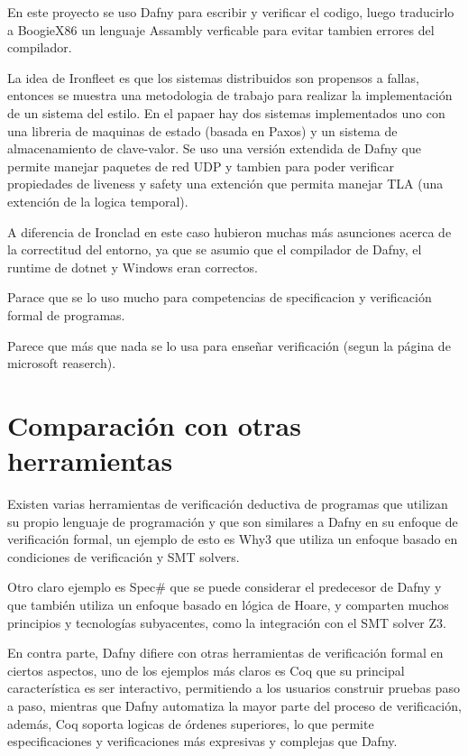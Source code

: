 \documentclass[runningheads]{llncs}
\begin{document}
En este proyecto se uso Dafny para escribir y verificar el codigo, luego traducirlo a BoogieX86 un lenguaje Assambly verficable para evitar tambien errores del compilador.

La idea de Ironfleet\cite{hawblitzel2015ironfleet} es que los sistemas distribuidos son propensos a fallas, entonces se muestra una metodologia de trabajo para realizar la implementación de un sistema del estilo. En el papaer hay dos sistemas implementados uno con una libreria de maquinas de estado (basada en Paxos) y un sistema de almacenamiento de clave-valor.
Se uso una versión extendida de Dafny que permite manejar paquetes de red UDP y tambien para poder verificar propiedades de liveness y safety una extención que permita manejar TLA (una extención de la logica temporal).

A diferencia de Ironclad en este caso hubieron muchas más asunciones acerca de la correctitud del entorno, ya que se asumio que el compilador de Dafny, el runtime de dotnet y Windows eran correctos.


Parace que se lo uso mucho para competencias de specificacion y verificación formal de programas.

Parece que más que nada se lo usa para enseñar verificación (segun la página de microsoft reaserch).

\section{Comparación con otras herramientas}

Existen varias herramientas de verificación deductiva de programas que utilizan su propio lenguaje de programación 
y que son similares a Dafny en su enfoque de verificación formal, 
un ejemplo de esto es Why3 que utiliza un enfoque basado en condiciones de verificación y SMT solvers.

Otro claro ejemplo es Spec\# que se puede considerar el predecesor de Dafny y que también utiliza un enfoque basado en lógica de Hoare,
y comparten muchos principios y tecnologías subyacentes, como la integración con el SMT solver Z3.

En contra parte, Dafny difiere con otras herramientas de verificación formal en ciertos aspectos, uno de los ejemplos más claros es Coq 
que su principal característica es ser interactivo, 
permitiendo a los usuarios construir pruebas paso a paso, mientras que Dafny automatiza la mayor parte del proceso de verificación,
además, Coq soporta logicas de órdenes superiores, lo que permite especificaciones y verificaciones más expresivas y complejas que Dafny.
\end{document}
